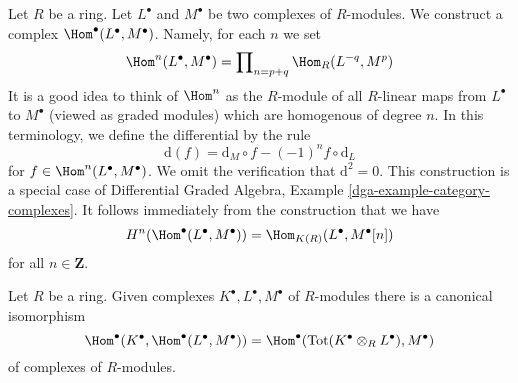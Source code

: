 \noindent
Let $R$ be a ring. Let $L^\bullet$ and $M^\bullet$ be two complexes
of $R$-modules. We construct a complex $\Hom^\bullet(L^\bullet, M^\bullet)$.
Namely, for each $n$ we set
$$
\Hom^n(L^\bullet, M^\bullet) =
\prod\nolimits_{n = p + q} \Hom_R(L^{-q}, M^p)
$$
It is a good idea to think of $\Hom^n$ as the $R$-module of all $R$-linear
maps from $L^\bullet$ to $M^\bullet$ (viewed as graded modules)
which are homogenous of degree $n$. In this terminology, we define the
differential by the rule
$$
\text{d}(f) = \text{d}_M \circ f - (-1)^n f \circ \text{d}_L
$$
for $f \in \Hom^n(L^\bullet, M^\bullet)$.
We omit the verification that $\text{d}^2 = 0$.
This construction is a special case of
Differential Graded Algebra, Example \ref{dga-example-category-complexes}.
It follows immediately from the construction that we have
\begin{equation}
\label{equation-cohomology-hom-complex}
H^n(\Hom^\bullet(L^\bullet, M^\bullet)) = \Hom_{K(R)}(L^\bullet, M^\bullet[n])
\end{equation}
for all $n \in \mathbf{Z}$.

\begin{lemma}
\label{lemma-compose}
Let $R$ be a ring. Given complexes $K^\bullet, L^\bullet, M^\bullet$
of $R$-modules there is a canonical isomorphism
$$
\Hom^\bullet(K^\bullet, \Hom^\bullet(L^\bullet, M^\bullet))
=
\Hom^\bullet(\text{Tot}(K^\bullet \otimes_R L^\bullet), M^\bullet)
$$
of complexes of $R$-modules.
\end{lemma}

